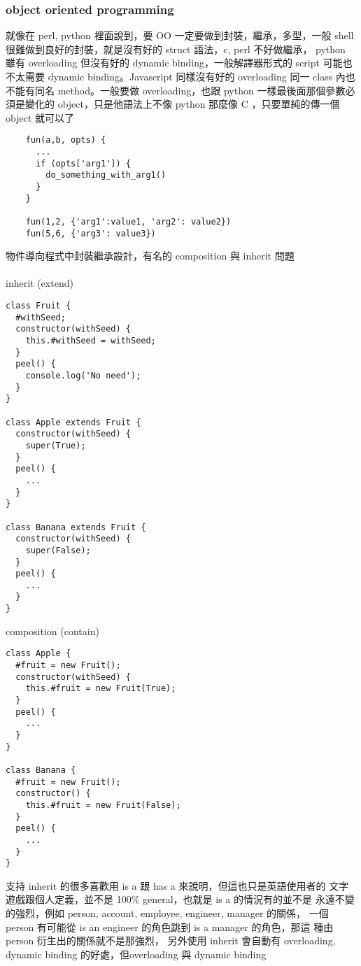   \subsubsection{object oriented programming}
    就像在 perl, python 裡面說到，要 OO 一定要做到封裝，繼承，多型，一般
    shell 很難做到良好的封裝，就是沒有好的 struct 語法，c, perl 不好做繼承，
    python 雖有 overloading 但沒有好的 dynamic binding，一般解譯器形式的
    script 可能也不太需要 dynamic binding。Javascript 同樣沒有好的 overloading
    同一 class 內也不能有同名 method。一般要做 overloading，也跟 python
    一樣最後面那個參數必須是變化的 object，只是他語法上不像 python 那麼像 C
    ，只要單純的傳一個 object 就可以了
    \begin{verbatim}
    fun(a,b, opts) {
      ...
      if (opts['arg1']) {
        do_something_with_arg1()
      }
    }

    fun(1,2, {'arg1':value1, 'arg2': value2})
    fun(5,6, {'arg3': value3})
    \end{verbatim}
    物件導向程式中封裝繼承設計，有名的 composition 與 inherit 問題
    \\\\
    inherit (extend)
    \begin{verbatim}
class Fruit {
  #withSeed;
  constructor(withSeed) {
    this.#withSeed = withSeed;
  }
  peel() {
    console.log('No need');
  }
}  

class Apple extends Fruit {
  constructor(withSeed) {
    super(True);
  }
  peel() {
    ...
  }
}

class Banana extends Fruit {
  constructor(withSeed) {
    super(False);
  }
  peel() {
    ...
  }
}
    \end{verbatim}
    composition (contain)
    \begin{verbatim}
class Apple {
  #fruit = new Fruit();
  constructor(withSeed) {
    this.#fruit = new Fruit(True);
  }
  peel() {
    ...
  }
}

class Banana {
  #fruit = new Fruit();
  constructor() {
    this.#fruit = new Fruit(False);
  }
  peel() {
    ...
  }
}
    \end{verbatim}
    支持 inherit 的很多喜歡用 is a 跟 has a 來說明，但這也只是英語使用者的
    文字遊戲跟個人定義，並不是 100\% general，也就是 is a 的情況有的並不是
    永遠不變的強烈，例如 person, account, employee, engineer, manager 的關係，
    一個 person 有可能從 is an engineer 的角色跳到 is a manager 的角色，那這
    種由 person 衍生出的關係就不是那強烈， 另外使用 inherit 會自動有
    overloading, dynamic binding 的好處，但overloading 與 dynamic binding
